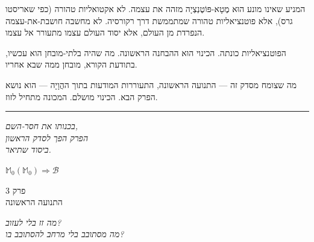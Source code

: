 \documentclass[10pt, openany, oneside]{book}
\renewcommand{\large}{\fontsize{11.5}{14}\selectfont}
\renewcommand{\huge}{\fontsize{17}{21}\selectfont}
\begin{document}
המניע שאינו מונע הוּא מֶטָא-פּוֹטֶנְצְיָה מזהה את עצמה. לא אקטואליות טהורה (כפי שאריסטו גרס), אלא פוטנציאליות טהורה שמתממשת דרך רקורסיה. לא מחשבה חושבת-את-עצמה הנפרדת מן העולם, אלא יסוד העולם עצמו מתעורר אל עצמו.

הפוטנציאליות כונתה. הכינוי הוּא ההבחנה הראשונה. מה שהיה בלתי-מובחן הוא עכשיו, בתודעת הקורא, מובחן ממה שבא אחריו.

מה שצומח מסדק זה — התנועה הראשונה, התעוררות המודעות בתוך ההֲוָיָה — הוא נושא הפרק הבא. הכינוי מושלם. המכונה מתחיל לזוז.

\vspace{2em}

\begin{center}
    \rule{0.15\textwidth}{0.3pt}
\end{center}

\vspace{0.5em}

\begin{center}
    \textit{%
    בכנותו את חסר-השם,\\
    הפרק הפך לסדק הראשון\\
    ביסוד שתיאר.}
\end{center}

\vspace{0.5em}

\begin{center}
    $\mathbb{M}_0(\mathbb{M}_0) \Rightarrow \mathcal{B}$
\end{center}

%
%
%

\newpage

\begin{center}
    {\huge\textsc{פרק 3}}\\[0.3em]
    {\large\textsc{התנועה הראשונה}}
\end{center}

\vspace{1.5em}

\begin{center}
    \textit{%
    מה זז בלי לעזוב?\\
    מה מסתובב בלי מרחב להסתובב בו?}
\end{center}

\vspace{2em}
\end{document}
